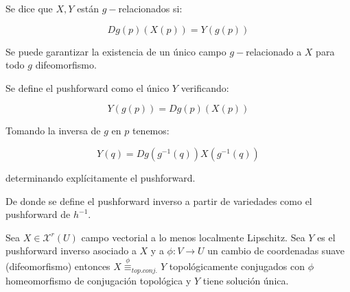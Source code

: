 \begin{rmrk}
	Se dice que $X,Y$ están $g-$relacionados si:
	
	\begin{equation*}
		Dg(p) (X(p)) = Y(g(p))
	\end{equation*}
	
	Se puede garantizar la existencia de un único campo $g-$relacionado a $X$ para todo $g$ difeomorfismo. 
	
	Se define el pushforward como el único $Y$ verificando: 
	
	\begin{equation*}
		Y(g(p))= Dg(p) (X(p)) 
	\end{equation*}
	
	Tomando la inversa de $g$ en $p$ tenemos:
	
	\begin{equation*}
		Y(q)= Dg(g^{-1}(q)) X(g^{-1}(q)) 
	\end{equation*}
	
	determinando explícitamente el pushforward.
	
	De donde se define el pushforward inverso a partir de variedades como el pushforward de $h^{-1}$.
\end{rmrk}

\begin{prop}
	Sea $X\in \mathcal{X}^r(U)$ campo vectorial a lo menos localmente Lipschitz.   Sea $Y$ es el pushforward inverso asociado a $X$ y a $\phi:V \to U$  un cambio de coordenadas suave (difeomorfismo) entonces $X\overset{\phi}{\equiv}_{top. conj.} Y$ topológicamente conjugados con $\phi$ homeomorfismo de conjugación topológica y $Y$ tiene solución única.
\end{prop}

